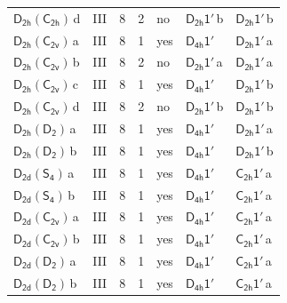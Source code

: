 \documentclass[10pt,a4paper]{article}
\numberwithin{equation}{section}
\newcommand{\grp}[1]{\mathsf{#1}}
\newcommand{\clsletter}[1]{\,{\scriptsize\color{black!55}#1}}
\begin{document}
{\begin{longtable}{@{}llrrlll@{}}
\href{D2h-C2h.pdf}{$\grp{D_{2h}}(\grp{C_{2h}})$}\clsletter{d} & III & 8 & 2 & no & \href{D2h-1p.pdf}{$\grp{D_{2h}1'}$}\clsletter{b} & \href{D2h-1p.pdf}{$\grp{D_{2h}1'}$}\clsletter{b}\\
\href{D2h-C2v.pdf}{$\grp{D_{2h}}(\grp{C_{2v}})$}\clsletter{a} & III & 8 & 1 & yes & \href{D4h-1p.pdf}{$\grp{D_{4h}1'}$} & \href{D2h-1p.pdf}{$\grp{D_{2h}1'}$}\clsletter{a}\\
\href{D2h-C2v.pdf}{$\grp{D_{2h}}(\grp{C_{2v}})$}\clsletter{b} & III & 8 & 2 & no & \href{D2h-1p.pdf}{$\grp{D_{2h}1'}$}\clsletter{a} & \href{D2h-1p.pdf}{$\grp{D_{2h}1'}$}\clsletter{a}\\
\href{D2h-C2v.pdf}{$\grp{D_{2h}}(\grp{C_{2v}})$}\clsletter{c} & III & 8 & 1 & yes & \href{D4h-1p.pdf}{$\grp{D_{4h}1'}$} & \href{D2h-1p.pdf}{$\grp{D_{2h}1'}$}\clsletter{b}\\
\href{D2h-C2v.pdf}{$\grp{D_{2h}}(\grp{C_{2v}})$}\clsletter{d} & III & 8 & 2 & no & \href{D2h-1p.pdf}{$\grp{D_{2h}1'}$}\clsletter{b} & \href{D2h-1p.pdf}{$\grp{D_{2h}1'}$}\clsletter{b}\\
\href{D2h-D2.pdf}{$\grp{D_{2h}}(\grp{D_{2}})$}\clsletter{a} & III & 8 & 1 & yes & \href{D4h-1p.pdf}{$\grp{D_{4h}1'}$} & \href{D2h-1p.pdf}{$\grp{D_{2h}1'}$}\clsletter{a}\\
\href{D2h-D2.pdf}{$\grp{D_{2h}}(\grp{D_{2}})$}\clsletter{b} & III & 8 & 1 & yes & \href{D4h-1p.pdf}{$\grp{D_{4h}1'}$} & \href{D2h-1p.pdf}{$\grp{D_{2h}1'}$}\clsletter{b}\\
\href{D2d-S4.pdf}{$\grp{D_{2d}}(\grp{S_{4}})$}\clsletter{a} & III & 8 & 1 & yes & \href{D4h-1p.pdf}{$\grp{D_{4h}1'}$} & \href{C2h-1p.pdf}{$\grp{C_{2h}1'}$}\clsletter{a}\\
\href{D2d-S4.pdf}{$\grp{D_{2d}}(\grp{S_{4}})$}\clsletter{b} & III & 8 & 1 & yes & \href{D4h-1p.pdf}{$\grp{D_{4h}1'}$} & \href{C2h-1p.pdf}{$\grp{C_{2h}1'}$}\clsletter{a}\\
\href{D2d-C2v.pdf}{$\grp{D_{2d}}(\grp{C_{2v}})$}\clsletter{a} & III & 8 & 1 & yes & \href{D4h-1p.pdf}{$\grp{D_{4h}1'}$} & \href{C2h-1p.pdf}{$\grp{C_{2h}1'}$}\clsletter{a}\\
\href{D2d-C2v.pdf}{$\grp{D_{2d}}(\grp{C_{2v}})$}\clsletter{b} & III & 8 & 1 & yes & \href{D4h-1p.pdf}{$\grp{D_{4h}1'}$} & \href{C2h-1p.pdf}{$\grp{C_{2h}1'}$}\clsletter{a}\\
\href{D2d-D2.pdf}{$\grp{D_{2d}}(\grp{D_{2}})$}\clsletter{a} & III & 8 & 1 & yes & \href{D4h-1p.pdf}{$\grp{D_{4h}1'}$} & \href{C2h-1p.pdf}{$\grp{C_{2h}1'}$}\clsletter{a}\\
\href{D2d-D2.pdf}{$\grp{D_{2d}}(\grp{D_{2}})$}\clsletter{b} & III & 8 & 1 & yes & \href{D4h-1p.pdf}{$\grp{D_{4h}1'}$} & \href{C2h-1p.pdf}{$\grp{C_{2h}1'}$}\clsletter{a}\\

\end{longtable}}
\end{document}
